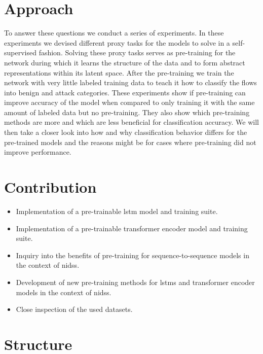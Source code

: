 \section{Approach} \label{sect.approach}

To answer these questions we conduct a series of experiments. In these experiments we devised different proxy tasks for the models to solve in a self-supervised fashion. Solving these proxy tasks serves as pre-training for the network during which it learns the structure of the data and to form abstract representations within its latent space. After the pre-training we train the network with very little labeled training data to teach it how to classify the flows into benign and attack categories. These experiments show if pre-training can improve accuracy of the model when compared to only training it with the same amount of labeled data but no pre-training. They also show which pre-training methods are more and which are less beneficial for classification accuracy. We will then take a closer look into how and why classification behavior differs for the pre-trained models and the reasons might be for cases where pre-training did not improve performance.

\section{Contribution} \label{sect.contribution}

\begin{itemize}
	\item Implementation of a pre-trainable \gls{lstm} model and training suite.
	\item Implementation of a pre-trainable transformer encoder model and training suite.
	\item Inquiry into the benefits of pre-training for sequence-to-sequence models in the context of \glspl{nids}.
	\item Development of new pre-training methods for \glspl{lstm} and transformer encoder models in the context of \glspl{nids}.
	\item Close inspection of the used datasets.
\end{itemize}

\section{Structure} \label{sect.structure}

